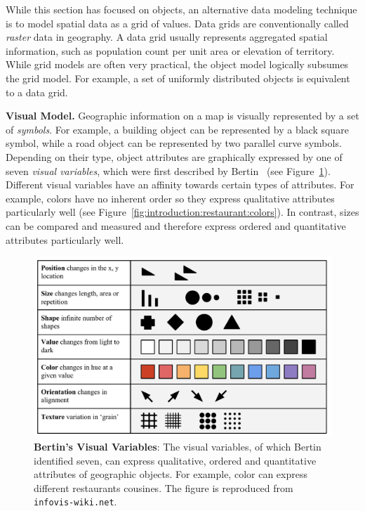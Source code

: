 \documentclass[11pt, oneside]{report}
\newcommand{\minisec}[1]{\noindent\textbf{#1.}}
\begin{document}
{While this section has focused on objects, an alternative data modeling technique is to model spatial data as a grid of values. Data grids are conventionally called \emph{raster} data in geography. A data grid usually represents aggregated spatial information, such as population count per unit area or elevation of territory. While grid models are often very practical, the object model logically subsumes the grid model. For example, a set of uniformly distributed objects is equivalent to a data grid.

\minisec{Visual Model}
Geographic information on a map is visually represented by a set of \emph{symbols}. For example, a building object can be represented by a black square symbol, while a road object can be represented by two parallel curve symbols. Depending on their type, object attributes are graphically expressed by one of seven \emph{visual variables}, which were first described by Bertin~\cite{bertin1967semiologie} (see Figure~\ref{fig:introduction:visual:variables}). Different visual variables have an affinity towards certain types of attributes. For example, colors have no inherent order so they express qualitative attributes particularly well (see Figure~\ref{fig:introduction:restaurant:colors}). In contrast, sizes can be compared and measured and therefore express ordered and quantitative attributes particularly well. 

\begin{figure}[htbp]
\begin{center}
\includegraphics[scale=.72]{figs-thesis/visual-variables.pdf}
\caption{\textbf{Bertin's Visual Variables}: The visual variables, of which Bertin identified seven, can express qualitative, ordered and quantitative attributes of geographic objects. For example, color can express different restaurants cousines. The figure is reproduced from \texttt{infovis-wiki.net}.}
\label{fig:introduction:visual:variables}
\end{center}
\vspace*{-4ex}
\end{figure}

}
\end{document}
